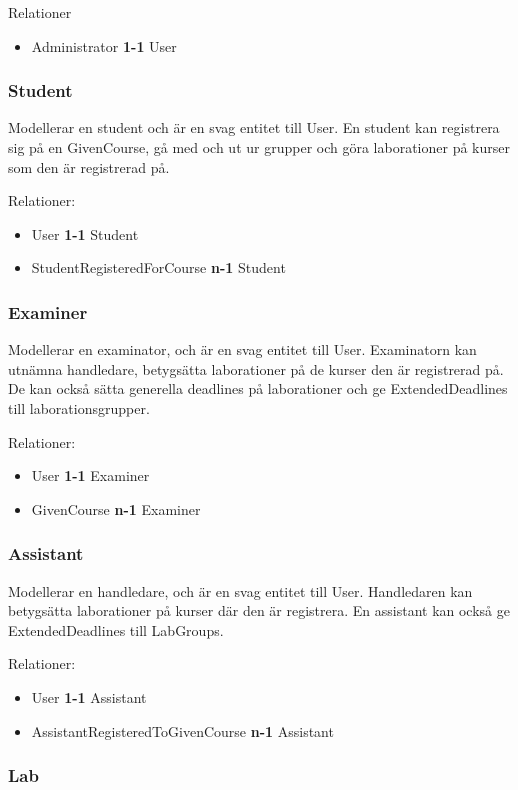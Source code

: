 Relationer
\begin{itemize}
  \item Administrator {\bf 1-1} User
\end{itemize}


\subsubsection{Student}
Modellerar en student och är en svag entitet till User. En student kan registrera sig på en GivenCourse, gå med och ut ur grupper och göra laborationer på kurser som den är registrerad på. 

Relationer: 
\begin{itemize}
  \item User {\bf 1-1} Student 
  \item StudentRegisteredForCourse {\bf n-1} Student
\end{itemize}

\subsubsection{Examiner}
Modellerar en examinator, och är en svag entitet till User. Examinatorn kan utnämna handledare, betygsätta laborationer på de kurser den är registrerad på. De kan också sätta generella deadlines på laborationer och ge ExtendedDeadlines till laborationsgrupper.  

Relationer: 
\begin{itemize}
  \item User {\bf 1-1} Examiner 
  \item GivenCourse {\bf n-1} Examiner 
\end{itemize}

\subsubsection{Assistant}
Modellerar en handledare, och är en svag entitet till User. Handledaren kan betygsätta laborationer på kurser där den är registrera. En assistant kan också ge ExtendedDeadlines till LabGroups. 

Relationer: 
\begin{itemize}
  \item User {\bf 1-1} Assistant 
  \item AssistantRegisteredToGivenCourse {\bf n-1} Assistant 
\end{itemize}

\subsubsection{Lab}

